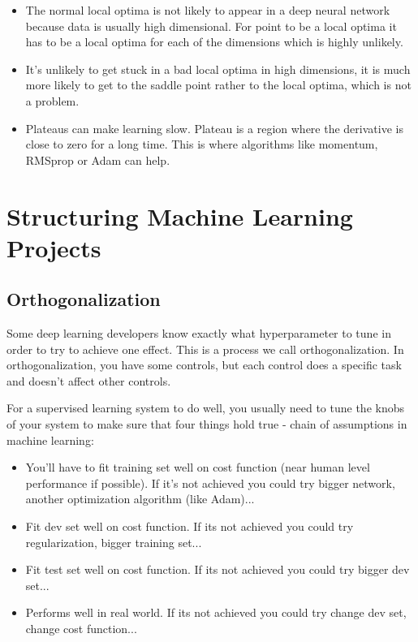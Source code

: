 \documentclass{article}
\begin{document}
\begin{itemize}
    \item The normal local optima is not likely to appear in a deep neural network because data is usually high dimensional. For point to be a local optima it has to be a local optima for each of the dimensions which is highly unlikely.
    \item It's unlikely to get stuck in a bad local optima in high dimensions, it is much more likely to get to the saddle point rather to the local optima, which is not a problem.
    \item Plateaus can make learning slow. Plateau is a region where the derivative is close to zero for a long time. This is where algorithms like momentum, RMSprop or Adam can help.
\end{itemize}

\section{Structuring Machine Learning Projects}

\subsection{Orthogonalization}

\noindent Some deep learning developers know exactly what hyperparameter to tune in order to try to achieve one effect. This is a process we call orthogonalization. In orthogonalization, you have some controls, but each control does a specific task and doesn't affect other controls.

\bigskip

\noindent For a supervised learning system to do well, you usually need to tune the knobs of your system to make sure that four things hold true - chain of assumptions in machine learning:

\begin{itemize}
    \item You'll have to fit training set well on cost function (near human level performance if possible). If it's not achieved you could try bigger network, another optimization algorithm (like Adam)...
    \item Fit dev set well on cost function. If its not achieved you could try regularization, bigger training set...
    \item Fit test set well on cost function. If its not achieved you could try bigger dev set...
    \item Performs well in real world. If its not achieved you could try change dev set, change cost function...
\end{itemize}
\end{document}
